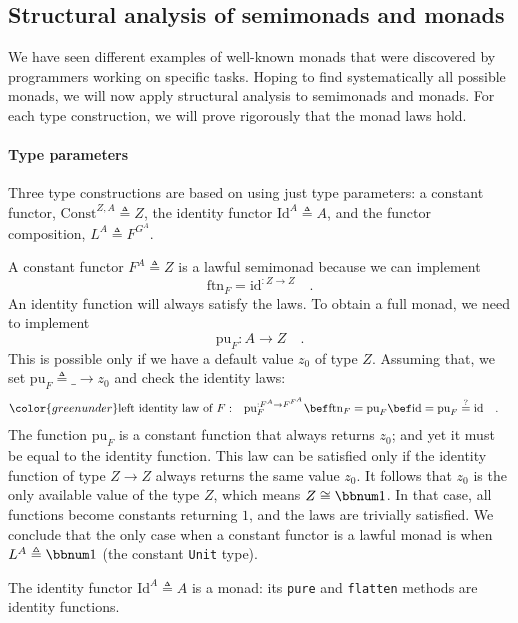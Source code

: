 \subsection{Structural analysis of semimonads and monads\label{subsec:Structural-analysis-of-monads}}

We have seen different examples of well-known monads that were discovered
by programmers working on specific tasks. Hoping to find systematically
all possible monads, we will now apply structural analysis to semimonads
and monads. For each type construction, we will prove rigorously that
the monad laws hold.

\paragraph{Type parameters}

Three type constructions are based on using just type parameters:
a constant functor, $\text{Const}^{Z,A}\triangleq Z$, the identity
functor $\text{Id}^{A}\triangleq A$, and the functor composition,
$L^{A}\triangleq F^{G^{A}}$.

A constant functor $F^{A}\triangleq Z$ is a lawful semimonad because
we can implement
\[
\text{ftn}_{F}=\text{id}^{:Z\rightarrow Z}\quad.
\]
An identity function will always satisfy the laws. To obtain a full
monad, we need to implement
\[
\text{pu}_{F}:A\rightarrow Z\quad.
\]
This is possible only if we have a default value $z_{0}$ of type
$Z$. Assuming that, we set $\text{pu}_{F}\triangleq\_\rightarrow z_{0}$
and check the identity laws:
\begin{align*}
{\color{greenunder}\text{left identity law of }F:}\quad & \text{pu}_{F}^{:F^{A}\rightarrow F^{F^{A}}}\bef\text{ftn}_{F}=\text{pu}_{F}\bef\text{id}=\text{pu}_{F}\overset{?}{=}\text{id}\quad.
\end{align*}
The function $\text{pu}_{F}$ is a constant function that always returns
$z_{0}$; and yet it must be equal to the identity function. This
law can be satisfied only if the identity function of type $Z\rightarrow Z$
always returns the same value $z_{0}$. It follows that $z_{0}$ is
the only available value of the type $Z$, which means $Z\cong\bbnum 1$.
In that case, all functions become constants returning $1$, and the
laws are trivially satisfied. We conclude that the only case when
a constant functor is a lawful monad is when $L^{A}\triangleq\bbnum 1$
(the constant \lstinline!Unit! type).

The identity functor $\text{Id}^{A}\triangleq A$ is a monad: its
\lstinline!pure! and \lstinline!flatten! methods are identity functions.

